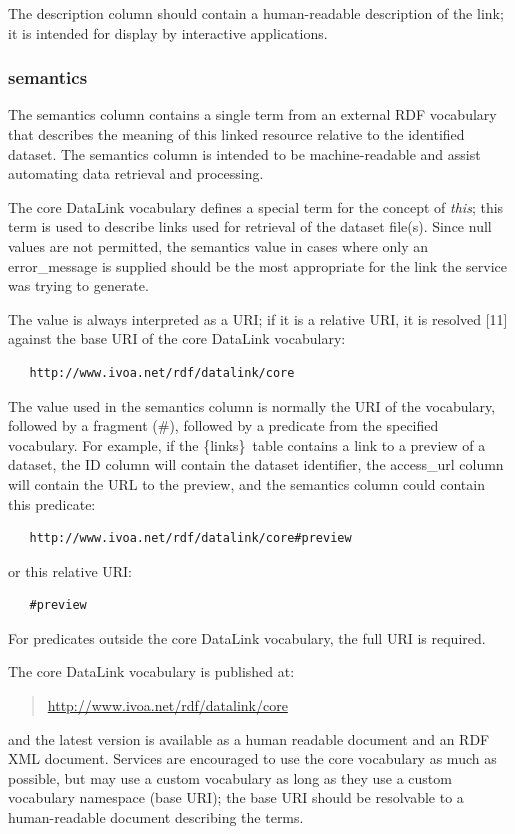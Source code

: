 \documentclass[11pt,a4paper]{ivoa}
\newcommand{\blinks}{\{links\}}
\begin{document}
The description column should contain a human-readable description of
the link; it is intended for display by interactive applications.


\subsubsection{semantics}

The semantics column contains a single term from an external RDF
vocabulary that describes the meaning of this linked resource relative
to the identified dataset. The semantics column is intended to be
machine-readable and assist automating data retrieval and processing.

The core DataLink vocabulary defines a special term for
the concept of {\em this\/};
this term is used to describe links used for retrieval of the
dataset file(s). Since null values are not permitted, the semantics
value in cases where only an error\_message is supplied should be the
most appropriate for the link the service was trying to generate.

The value is always interpreted as a URI; if it is a relative URI,
it is resolved [11] against the base URI of the
core DataLink vocabulary:
\begin{verbatim}
   http://www.ivoa.net/rdf/datalink/core
\end{verbatim}

The value used in the semantics column is normally the URI of the
vocabulary, followed by a fragment (\#), followed by a predicate from
the specified vocabulary.  For example, if the \blinks\ table contains a
link to a preview of a dataset, the ID column will contain the dataset
identifier, the access\_url column will contain the URL to the preview,
and the semantics column could contain this predicate:
\begin{verbatim}
   http://www.ivoa.net/rdf/datalink/core#preview
\end{verbatim}
or this relative URI:
\begin{verbatim}
   #preview
\end{verbatim}
For predicates outside the core DataLink vocabulary,
the full URI is required.

The core DataLink vocabulary is published at:
\begin{quote}
  \url{http://www.ivoa.net/rdf/datalink/core}
\end{quote}
and the latest version is available as a human readable document and an
RDF XML document. Services are encouraged to use the core vocabulary
as much as possible, but may use a custom vocabulary as long as they
use a custom vocabulary namespace (base URI); the base URI should be
resolvable to a human-readable document describing the terms.
\end{document}
